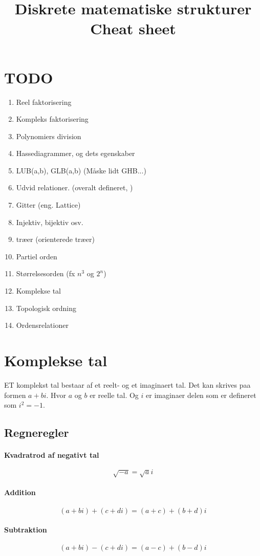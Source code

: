 \documentclass[a4paper]{article}
\title{Diskrete matematiske strukturer\\
          Cheat sheet}
\author {}
\date{}
\begin{document}
\maketitle
\tableofcontents
\clearpage
\section{TODO}
  \begin{enumerate}
    \item Reel faktorisering
    \item Kompleks faktorisering
    \item Polynomiers division
    \item Hassediagrammer, og dets egenskaber
    \item LUB(a,b), GLB(a,b) (Måske lidt GHB...)
    \item Udvid relationer. (overalt defineret, )
    \item Gitter (eng. Lattice)
    \item Injektiv, bijektiv osv.
    \item træer (orienterede træer)
    \item Partiel orden %
    \item Størrelsesorden (fx $n^3$ og $2^n$)
    \item Komplekse tal
    \item Topologisk ordning %
    \item Ordensrelationer %
  \end{enumerate}
\section{Komplekse tal}
ET komplekst tal bestaar af et reelt- og et imaginaert tal. Det kan skrives paa formen $a + bi$. Hvor $a$ og $b$ er reelle tal. Og $i$ er imaginaer delen som er defineret som $i^2 = -1$.
 \subsection{Regneregler}
  \paragraph{Kvadratrod af negativt tal}
   $$\sqrt{-a} = \sqrt{a}i$$
  \paragraph{Addition}
   $$(a + bi) + (c + di) = (a + c) + (b + d)i$$
  \paragraph{Subtraktion}
   $$(a + bi) - (c + di) = (a - c) + (b - d)i$$
\end{document}
